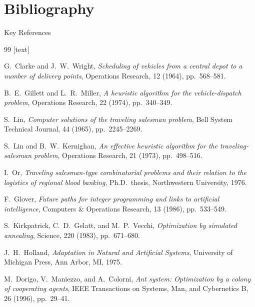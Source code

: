 \documentclass[aspectratio=169,10pt]{beamer}
\begin{document}
\section{Bibliography}

\begin{frame}[allowframebreaks]{Key References}

  \begin{thebibliography}{99}
  [text]

    G.\ Clarke and J.\ W.\ Wright,
    \emph{Scheduling of vehicles from a central depot to a number of
      delivery points},
    Operations Research, 12 (1964), pp.\ 568--581.

    B.\ E.\ Gillett and L.\ R.\ Miller,
    \emph{A heuristic algorithm for the vehicle-dispatch problem},
    Operations Research, 22 (1974), pp.\ 340--349.

    S.\ Lin,
    \emph{Computer solutions of the traveling salesman problem},
    Bell System Technical Journal, 44 (1965), pp.\ 2245--2269.

    S.\ Lin and B.\ W.\ Kernighan,
    \emph{An effective heuristic algorithm for the traveling-salesman problem},
    Operations Research, 21 (1973), pp.\ 498--516.

    I.\ Or,
    \emph{Traveling salesman-type combinatorial problems and their
      relation to the logistics of regional blood banking},
    Ph.D.\ thesis, Northwestern University, 1976.

    F.\ Glover,
    \emph{Future paths for integer programming and links to artificial
      intelligence},
    Computers \& Operations Research, 13 (1986), pp.\ 533--549.

    S.\ Kirkpatrick, C.\ D.\ Gelatt, and M.\ P.\ Vecchi,
    \emph{Optimization by simulated annealing},
    Science, 220 (1983), pp.\ 671--680.

    J.\ H.\ Holland,
    \emph{Adaptation in Natural and Artificial Systems},
    University of Michigan Press, Ann Arbor, MI, 1975.

    M.\ Dorigo, V.\ Maniezzo, and A.\ Colorni,
    \emph{Ant system: Optimization by a colony of cooperating agents},
    IEEE Transactions on Systems, Man, and Cybernetics B,
    26 (1996), pp.\ 29--41.


\end{thebibliography}
\end{frame}
\end{document}
